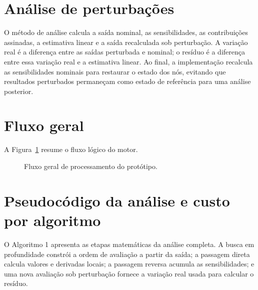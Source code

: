 \documentclass[12pt,openright,oneside,a4paper,brazil]{abntex2}
\begin{document}
\section{Análise de perturbações}
O método de análise calcula a saída nominal, as sensibilidades, as contribuições assinadas, a estimativa linear e a saída recalculada sob perturbação. A variação real é a diferença entre as saídas perturbada e nominal; o resíduo é a diferença entre essa variação real e a estimativa linear. Ao final, a implementação recalcula as sensibilidades nominais para restaurar o estado dos nós, evitando que resultados perturbados permaneçam como estado de referência para uma análise posterior.

\section{Fluxo geral}
A Figura~\ref{fig:fluxo} resume o fluxo lógico do motor.
\begin{figure}[H]
\centering
{}
\caption{Fluxo geral de processamento do protótipo.}
\label{fig:fluxo}
\end{figure}

\clearpage
\section{Pseudocódigo da análise e custo por algoritmo}
O Algoritmo 1 apresenta as etapas matemáticas da análise completa. A busca em profundidade constrói a ordem de avaliação a partir da saída; a passagem direta calcula valores e derivadas locais; a passagem reversa acumula as sensibilidades; e uma nova avaliação sob perturbação fornece a variação real usada para calcular o resíduo.
\end{document}
